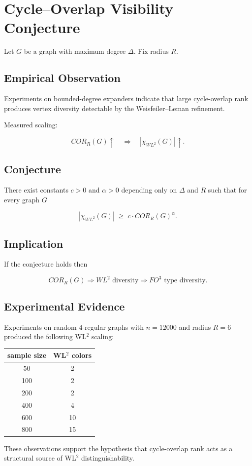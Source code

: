 \section{Cycle--Overlap Visibility Conjecture}

Let \(G\) be a graph with maximum degree \(\Delta\).
Fix radius \(R\).

\subsection{Empirical Observation}

Experiments on bounded-degree expanders indicate that
large cycle-overlap rank produces vertex diversity
detectable by the Weisfeiler--Leman refinement.

Measured scaling:

\[
COR_R(G) \uparrow
\quad\Longrightarrow\quad
|\chi_{WL^2}(G)| \uparrow .
\]

\subsection{Conjecture}

\begin{conjecture}
There exist constants \(c>0\) and \(\alpha>0\) depending only on
\(\Delta\) and \(R\) such that for every graph \(G\)

\[
|\chi_{WL^2}(G)|
\;\ge\;
c \cdot COR_R(G)^{\alpha}.
\]
\end{conjecture}

\subsection{Implication}

If the conjecture holds then

\[
COR_R(G)
\Rightarrow
WL^2\text{ diversity}
\Rightarrow
FO^3\text{ type diversity}.
\]

\subsection{Experimental Evidence}

Experiments on random \(4\)-regular graphs with \(n=12000\)
and radius \(R=6\) produced the following WL\(^2\) scaling:

\begin{center}
\begin{tabular}{c|c}
sample size & WL\(^2\) colors \\
\hline
50 & 2 \\
100 & 2 \\
200 & 2 \\
400 & 4 \\
600 & 10 \\
800 & 15
\end{tabular}
\end{center}

These observations support the hypothesis that cycle-overlap
rank acts as a structural source of WL\(^2\) distinguishability.
